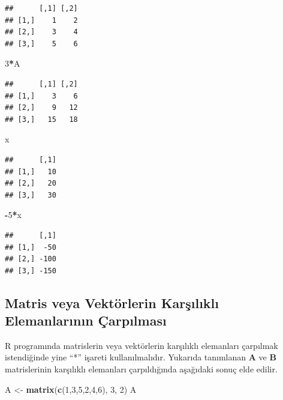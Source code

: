 \documentclass[
]{book}
\newenvironment{Shaded}{\begin{snugshade}}{\end{snugshade}}
\newcommand{\DecValTok}[1]{\textcolor[rgb]{0.00,0.00,0.81}{#1}}
\newcommand{\FunctionTok}[1]{\textcolor[rgb]{0.13,0.29,0.53}{\textbf{#1}}}
\newcommand{\NormalTok}[1]{#1}
\newcommand{\OtherTok}[1]{\textcolor[rgb]{0.56,0.35,0.01}{#1}}
\newcommand{\SpecialCharTok}[1]{\textcolor[rgb]{0.81,0.36,0.00}{\textbf{#1}}}
\begin{document}
\begin{verbatim}
##      [,1] [,2]
## [1,]    1    2
## [2,]    3    4
## [3,]    5    6
\end{verbatim}

\begin{Shaded}
\begin{Highlighting}[]
 \DecValTok{3}\SpecialCharTok{*}\NormalTok{A }
\end{Highlighting}
\end{Shaded}

\begin{verbatim}
##      [,1] [,2]
## [1,]    3    6
## [2,]    9   12
## [3,]   15   18
\end{verbatim}

\begin{Shaded}
\begin{Highlighting}[]
\NormalTok{ x }
\end{Highlighting}
\end{Shaded}

\begin{verbatim}
##      [,1]
## [1,]   10
## [2,]   20
## [3,]   30
\end{verbatim}

\begin{Shaded}
\begin{Highlighting}[]
 \SpecialCharTok{{-}}\DecValTok{5}\SpecialCharTok{*}\NormalTok{x }
\end{Highlighting}
\end{Shaded}

\begin{verbatim}
##      [,1]
## [1,]  -50
## [2,] -100
## [3,] -150
\end{verbatim}

\subsection{Matris veya Vektörlerin Karşılıklı Elemanlarının Çarpılması}\label{matris-veya-vektuxf6rlerin-karux15fux131lux131klux131-elemanlarux131nux131n-uxe7arpux131lmasux131}

R programında matrislerin veya vektörlerin karşılıklı elemanları çarpılmak istendiğinde yine ``*'' işareti kullanılmalıdır. Yukarıda tanımlanan \textbf{A} ve \textbf{B} matrislerinin karşılıklı elemanları çarpıldığında aşağıdaki sonuç elde edilir.

\begin{Shaded}
\begin{Highlighting}[]
\NormalTok{ A }\OtherTok{\textless{}{-}} \FunctionTok{matrix}\NormalTok{(}\FunctionTok{c}\NormalTok{(}\DecValTok{1}\NormalTok{,}\DecValTok{3}\NormalTok{,}\DecValTok{5}\NormalTok{,}\DecValTok{2}\NormalTok{,}\DecValTok{4}\NormalTok{,}\DecValTok{6}\NormalTok{), }\DecValTok{3}\NormalTok{, }\DecValTok{2}\NormalTok{) }
\NormalTok{ A }
\end{Highlighting}
\end{Shaded}
\end{document}
